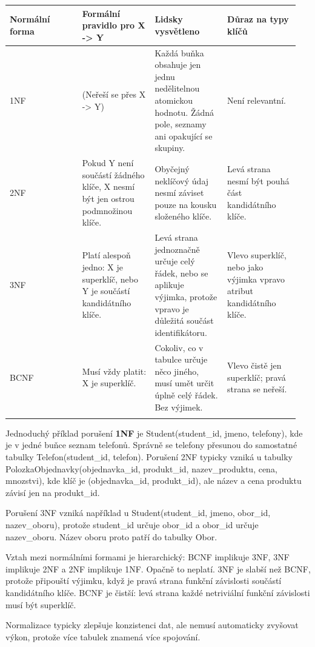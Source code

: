 \begin{longtable}{p{0.237\linewidth}p{0.237\linewidth}p{0.237\linewidth}p{0.237\linewidth}}
\toprule
\textbf{Normální forma} & \textbf{Formální pravidlo pro X -> Y} & \textbf{Lidsky vysvětleno} & \textbf{Důraz na typy klíčů} \\
\midrule\endhead
1NF & (Neřeší se přes X -> Y) & Každá buňka obsahuje jen jednu nedělitelnou atomickou hodnotu. Žádná pole, seznamy ani opakující se skupiny. & Není relevantní. \\
\addlinespace
2NF & Pokud Y není součástí žádného klíče, X nesmí být jen ostrou podmnožinou klíče. & Obyčejný neklíčový údaj nesmí záviset pouze na kousku složeného klíče. & Levá strana nesmí být pouhá část kandidátního klíče. \\
\addlinespace
3NF & Platí alespoň jedno: X je superklíč, nebo Y je součástí kandidátního klíče. & Levá strana jednoznačně určuje celý řádek, nebo se aplikuje výjimka, protože vpravo je důležitá součást identifikátoru. & Vlevo superklíč, nebo jako výjimka vpravo atribut kandidátního klíče. \\
\addlinespace
BCNF & Musí vždy platit: X je superklíč. & Cokoliv, co v tabulce určuje něco jiného, musí umět určit úplně celý řádek. Bez výjimek. & Vlevo čistě jen superklíč; pravá strana se neřeší. \\
\addlinespace
\bottomrule
\end{longtable}

Jednoduchý příklad porušení \textbf{1NF} je Student(student\_id, jmeno, telefony), kde je v jedné buňce seznam telefonů. Správně se telefony přesunou do samostatné tabulky Telefon(student\_id, telefon). Porušení 2NF typicky vzniká u tabulky PolozkaObjednavky(objednavka\_id, produkt\_id, nazev\_produktu, cena, mnozstvi), kde klíč je (objednavka\_id, produkt\_id), ale název a cena produktu závisí jen na produkt\_id.

Porušení 3NF vzniká například u Student(student\_id, jmeno, obor\_id, nazev\_oboru), protože student\_id určuje obor\_id a obor\_id určuje nazev\_oboru. Název oboru proto patří do tabulky Obor.

Vztah mezi normálními formami je hierarchický: BCNF implikuje 3NF, 3NF implikuje 2NF a 2NF implikuje 1NF. Opačně to neplatí. 3NF je slabší než BCNF, protože připouští výjimku, když je pravá strana funkční závislosti součástí kandidátního klíče. BCNF je čistší: levá strana každé netriviální funkční závislosti musí být superklíč.

Normalizace typicky zlepšuje konzistenci dat, ale nemusí automaticky zvyšovat výkon, protože více tabulek znamená více spojování.

